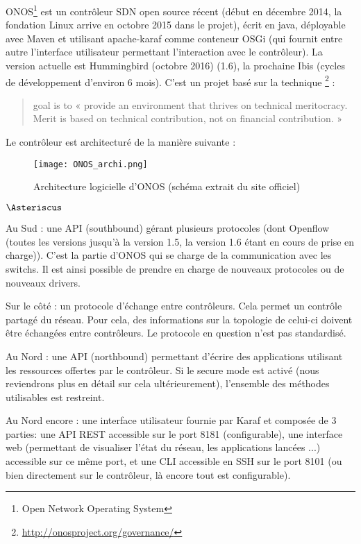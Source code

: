 ONOS\footnote{Open Network Operating System} est un contrôleur SDN open source récent (début en décembre 2014, la fondation Linux arrive en octobre 2015 dans le projet), écrit en java, déployable avec Maven et utilisant apache-karaf comme conteneur OSGi (qui fournit entre autre l’interface utilisateur permettant l’interaction avec le contrôleur).
La version actuelle est Hummingbird (octobre 2016) (1.6), la prochaine Ibis (cycles de développement d'environ 6 mois).
C'est un projet basé sur la technique \footnote{\url{http://onosproject.org/governance/}} : \begin{quote}
goal is to « provide an environment that thrives on technical meritocracy. Merit is based on technical contribution, not on financial contribution. »
\end{quote}

Le contrôleur est architecturé de la manière suivante :
\begin{figure}[h]
  	\centering
  	\texttt{[image: ONOS\_archi.png]}
  	\caption{Architecture logicielle d'ONOS (schéma extrait du site officiel)}
\end{figure}

\begin{list}{$\Asteriscus$}{}

\item Au Sud : une API (southbound) gérant plusieurs protocoles (dont Openflow (toutes les versions jusqu’à la version 1.5, la version 1.6 étant en cours de prise en charge)). C’est la partie d’ONOS qui se charge de la communication avec les switchs. Il est ainsi possible de prendre en charge de nouveaux protocoles ou de nouveaux drivers.

\item Sur le côté : un protocole d’échange entre contrôleurs. Cela permet un contrôle partagé du réseau. Pour cela, des informations sur la topologie de celui-ci doivent être échangées entre contrôleurs. Le protocole en question n'est pas standardisé.

\item Au Nord : une API (northbound) permettant d’écrire des applications utilisant les ressources offertes par le contrôleur. Si le secure mode est activé (nous reviendrons plus en détail sur cela ultérieurement), l’ensemble des méthodes utilisables est restreint. 

\item Au Nord encore : une interface utilisateur fournie par Karaf et composée de 3 parties: une API REST accessible sur le port 8181 (configurable), une interface web (permettant de visualiser l’état du réseau, les applications lancées ...) accessible sur ce même port, et une CLI accessible en SSH sur le port 8101 (ou bien directement sur le contrôleur, là encore tout est configurable).

\end{list}